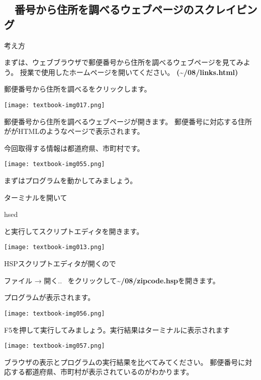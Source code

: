 \clearpage\subsection*{\theExercise　番号から住所を調べるウェブページのスクレイピング}
\addtocounter{Exercise}{-1}\label{E:postNum}
\noindent 考え方

まずは、ウェブブラウザで郵便番号から住所を調べるウェブページを見てみよう。
授業で使用したホームページを開いてください。
\textbf{({\textasciitilde}/08/links.html)}

郵便番号から住所を調べるをクリックします。
\begin{center}
  \texttt{[image: textbook-img017.png]}
\end{center}

郵便番号から住所を調べるウェブページが開きます。
郵便番号に対応する住所ががHTMLのようなページで表示されます。

今回取得する情報は都道府県、市町村です。

\begin{center}
  \texttt{[image: textbook-img055.png]}
\end{center}

\clearpage
まずはプログラムを動かしてみましょう。

ターミナルを開いて

hsed

と実行してスクリプトエディタを開きます。



\begin{center}
  \texttt{[image: textbook-img013.png]}
\end{center}
HSPスクリプトエディタが開くので

ファイル → 開く.. \ をクリックして\textbf{{\textasciitilde}/08/zipcode.hsp}を開きます。

プログラムが表示されます。

\begin{center}
  \texttt{[image: textbook-img056.png]}
\end{center}


\clearpage
F5を押して実行してみましょう。実行結果はターミナルに表示されます

\begin{center}
  \texttt{[image: textbook-img057.png]}
\end{center}
ブラウザの表示とプログラムの実行結果を比べてみてください。
郵便番号に対応する都道府県、市町村が表示されているのがわかります。

